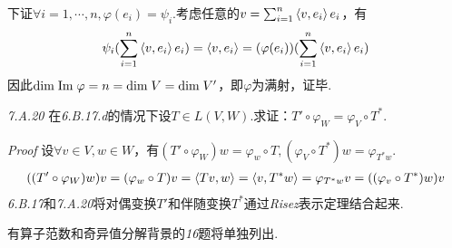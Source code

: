 下证\(\forall i=1,\cdots,n,\varphi(e_i)=\psi_i\).考虑任意的\(v=\sum_{i=1}^n \left\langle v,e_i \right\rangle e_i\)，有
    \begin{align*}
        \psi_i(\sum_{i=1}^n \left\langle v,e_i \right\rangle e_i)=\left\langle v,e_i \right\rangle=(\varphi(e_i))(\sum_{i=1}^n \left\langle v,e_i \right\rangle e_i)
    \end{align*}
因此\(\mathrm{dim \;} \mathrm{Im \;} \varphi=n=\mathrm{dim \;} V=\mathrm{dim \;} V'\)，即\(\varphi\)为满射，证毕.

\hspace*{\fill}

\textit{7.A.20}
在\textit{6.B.17.d}的情况下设\(T \in L(V,W)\).求证：\(T' \circ \varphi_W=\varphi_V \circ T^*\).

\textit{Proof}
设\(\forall v \in V,w \in W\)，有\((T' \circ \varphi_W)w=\varphi_w \circ T,(\varphi_V \circ T^*)w=\varphi_{T^*w}\).
    \begin{align*}
        ((T' \circ \varphi_W)w)v=(\varphi_w \circ T)v=\left\langle Tv,w \right\rangle
        =\left\langle v,T^*w \right\rangle=\varphi_{T^*w}v=((\varphi_v \circ T^*)w)v
    \end{align*}
\textit{6.B.17}和\textit{7.A.20}将对偶变换\(T'\)和伴随变换\(T^*\)通过\textit{Risez}表示定理结合起来.

\hspace*{\fill}

有算子范数和奇异值分解背景的\textit{16}题将单独列出.

